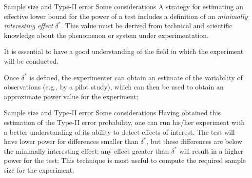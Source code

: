 \documentclass[t]{beamer}
\begin{document}
\begin{ftst}{Sample size and Type-II error}
{Some considerations}
A strategy for estimating an effective lower bound for the power of a test includes a definition of an \textit{minimally interesting effect} $\delta^*$. 
\vone
This value must be derived from technical and scientific knowledge about the phenomenon or system under experimentation. 
\vhalf
\begin{block}{}
\centering It is essential to have a good understanding of the field in which the experiment will be conducted.
\end{block}
\vhalf
Once $\delta^*$ is defined, the experimenter can obtain an estimate of the variability of observations (e.g., by a pilot study), which can then be used to obtain an approximate power value for the experiment;
\end{ftst}


\begin{ftst}
{Sample size and Type-II error}
{Some considerations}
Having obtained this estimation of the Type-II error probability, one can run his/her experiment with a better understanding of its ability to detect effects of interest.
\vone
The test will have lower power for differences smaller than $\delta^*$, but these differences are below the minimally interesting effect; any effect greater than $\delta^*$ will result in a higher power for the test;
\vone
This technique is most useful to compute the required sample size for the experiment.
\end{ftst}

\end{document}
